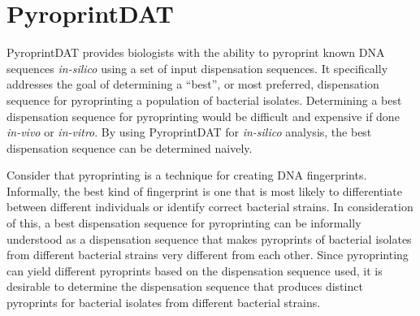 \documentclass[12pt]{ucthesis}
\begin{document}
   \section{PyroprintDAT}\label{sec:pyroprintdat}
      PyroprintDAT provides biologists with the ability to pyroprint known DNA
      sequences \textit{in-silico} using a set of input dispensation sequences.
      It specifically addresses the goal of determining a ``best'', or most
      preferred, dispensation sequence for pyroprinting a population of bacterial
      isolates. Determining a best dispensation sequence for pyroprinting would be
      difficult and expensive if done \textit{in-vivo} or \textit{in-vitro}. By
      using PyroprintDAT for \textit{in-silico} analysis, the best dispensation
      sequence can be determined naively.

      Consider that pyroprinting is a technique for creating DNA fingerprints.
      Informally, the best kind of fingerprint is one that is most likely to
      differentiate between different individuals or identify correct bacterial
      strains. In consideration of this, a best dispensation sequence for
      pyroprinting can be informally understood as a dispensation sequence that
      makes pyroprints of bacterial isolates from different bacterial strains
      very different from each other. Since pyroprinting can yield different
      pyroprints based on the dispensation sequence used, it is desirable to
      determine the dispensation sequence that produces distinct pyroprints for
      bacterial isolates from different bacterial strains.
\end{document}
